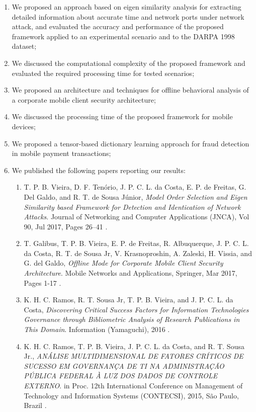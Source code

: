 \begin{enumerate}
	\item We proposed an approach based on eigen similarity analysis for extracting detailed information about accurate time and network ports under network attack, and evaluated the accuracy and performance of the proposed framework applied to an experimental scenario and to the DARPA 1998 dataset;
	\item We discussed the computational complexity of the proposed framework and evaluated the required processing time for tested scenarios;
	\item We proposed an architecture and techniques for offline behavioral analysis of a corporate mobile client security architecture;
	\item We discussed the processing time of the proposed framework for mobile devices;
	\item We proposed a tensor-based dictionary learning approach for fraud detection in mobile payment transactions;
	\item We published the following papers reporting our results:
	\begin{enumerate}
		\item T. P. B. Vieira, D. F. Ten\'orio, J. P. C. L. da Costa, E. P. de Freitas, G. Del Galdo, and R. T. de Sousa J\'unior, \textit{Model Order Selection and Eigen Similarity based Framework for Detection and Identication of Network Attacks}. Journal of Networking and Computer Applications (JNCA), Vol 90, Jul 2017, Pages 26–41 \cite{vieira2017model}.
		\item T. Galibus, T. P. B. Vieira, E. P. de Freitas, R. Albuquerque, J. P. C. L. da Costa, R. T. de Sousa Jr, V. Krasnoproshin, A. Zaleski, H. Vissia, and G. del Galdo, \textit{Offline Mode for Corporate Mobile Client Security Architecture}. Mobile Networks and Applications, Springer, Mar 2017, Pages 1-17 \cite{galibus2017offline}.
		\item K. H. C. Ramos, R. T. Sousa Jr, T. P. B. Vieira, and J. P. C. L. da Costa, \textit{Discovering Critical Success Factors for Information Technologies Governance through Bibliometric Analysis of Research Publications in This Domain}. Information (Yamaguchi), 2016 \cite{ramos2016information}.
		\item K. H. C. Ramos, T. P. B. Vieira, J. P. C. L. da Costa, and R. T. Sousa Jr., \textit{ANÁLISE MULTIDIMENSIONAL DE FATORES CRÍTICOS DE SUCESSO EM GOVERNANÇA DE TI NA ADMINISTRAÇÃO PÚBLICA FEDERAL À LUZ DOS DADOS DE CONTROLE EXTERNO}. in Proc. 12th International Conference on Management of Technology and Information Systems (CONTECSI), 2015, São Paulo, Brazil \cite{}.
	\end{enumerate}
\end{enumerate}


